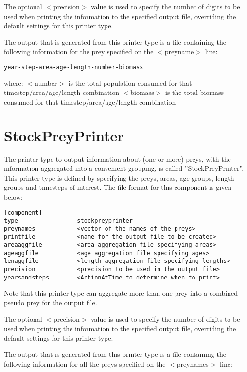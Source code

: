 \documentclass[10pt,twoside]{book}
\begin{document}
The optional $<$precision$>$ value is used to specify the number of digits to be used when printing the information to the specified output file, overriding the default settings for this printer type.

\bigskip
The output that is generated from this printer type is a file containing the following information for the prey specified on the $<$preyname$>$ line:

{\small\begin{verbatim}
year-step-area-age-length-number-biomass
\end{verbatim}}

where:\newline
$<$number$>$ is the total population consumed for that timestep/area/age/length combination\newline
$<$biomass$>$ is the total biomass consumed for that timestep/area/age/length combination

\section{StockPreyPrinter}\label{sec:stockpreyprinter}
The printer type to output information about (one or more) preys, with the information aggregated into a convenient grouping, is called ''StockPreyPrinter''.  This printer type is defined by specifying the preys, areas, age groups, length groups and timesteps of interest.  The file format for this component is given below:

{\small\begin{verbatim}
[component]
type                 stockpreyprinter
preynames            <vector of the names of the preys>
printfile            <name for the output file to be created>
areaaggfile          <area aggregation file specifying areas>
ageaggfile           <age aggregation file specifying ages>
lenaggfile           <length aggregation file specifying lengths>
precision            <precision to be used in the output file>
yearsandsteps        <ActionAtTime to determine when to print>
\end{verbatim}}

Note that this printer type can aggregate more than one prey into a combined pseudo prey for the output file.

\bigskip
The optional $<$precision$>$ value is used to specify the number of digits to be used when printing the information to the specified output file, overriding the default settings for this printer type.

\bigskip
The output that is generated from this printer type is a file containing the following information for all the preys specified on the $<$preynames$>$ line:
\end{document}
